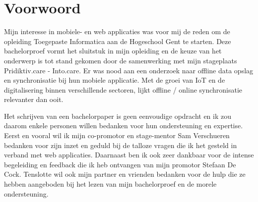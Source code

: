 
\chapter*{Voorwoord}
\label{ch:voorwoord}


Mijn interesse in mobiele- en web applicaties was voor mij de reden om de opleiding Toegepaste Informatica aan de Hogeschool Gent te starten. Deze bachelorproef vormt het sluitstuk in mijn opleiding en de keuze van het onderwerp is tot stand gekomen door de samenwerking met mijn stageplaats Pridiktiv.care - Into.care. Er was nood aan een onderzoek naar offline data opslag en synchronisatie bij hun mobiele applicatie. Met de groei van IoT en de digitalisering binnen verschillende sectoren, lijkt offline / online synchronisatie relevanter dan ooit.

Het schrijven van een bachelorpaper is geen eenvoudige opdracht en ik zou daarom enkele personen willen bedanken voor hun ondersteuning en expertise. Eerst en vooral wil ik mijn co-promotor en stage-mentor Sam Verschueren bedanken voor zijn inzet en geduld bij de talloze vragen die ik het gesteld in verband met web applicaties. Daarnaast ben ik ook zeer dankbaar voor de intense begeleiding en feedback die ik heb ontvangen van mijn promotor Stefaan De Cock. Tenslotte wil ook mijn partner en vrienden bedanken voor de hulp die ze hebben aangeboden bij het lezen van mijn bachelorproef en de morele ondersteuning.